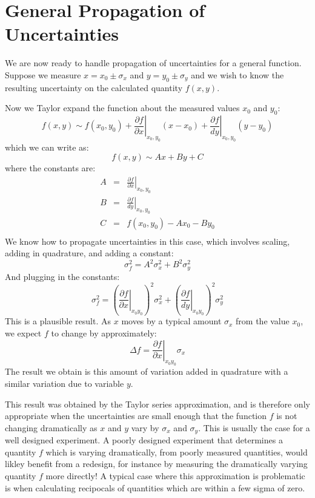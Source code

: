 \documentclass[12pt,oneside]{book}
\begin{document}
\section{General Propagation of Uncertainties}

We are now ready to handle propagation of uncertainties for a general
function.  Suppose we measure $x = x_0 \pm \sigma_x$ and $y = y_0 \pm
\sigma_y$ and we wish to know the resulting uncertainty on the
calculated quantity $f(x,y)$.

Now we Taylor expand the function about the measured values $x_0$ and $y_0$:
\begin{equation*}
f(x,y) \sim f(x_0,y_0) + \left.\frac{\partial f}{\partial x}\right|_{x_0,y_0} (x-x_0) + \left.\frac{\partial f}{dy}\right|_{x_0,y_0} (y-y_0) 
\end{equation*}
which we can write as:
\begin{equation*}
f(x,y) \sim A x + B y + C  
\end{equation*}
where the constants are:
\begin{eqnarray*}
  A  &=& \left.\frac{\partial f}{\partial x}\right|_{x_0,y_0}\\
  B  &=& \left.\frac{\partial f}{dy}\right|_{x_0,y_0}\\
  C  &=& f(x_0,y_0) - A x_0 - B y_0\\
\end{eqnarray*}
We know how to propagate uncertainties in this case, which involves scaling, adding in quadrature, and adding a constant:
\begin{equation*}
\sigma_f^2 =   A^2 \sigma_x^2 + B^2 \sigma_y^2 
\end{equation*}
And plugging in the constants:
\begin{equation}
\label{eqn:prop}
\sigma^2_f = \left(\left.\frac{\partial f}{\partial x}\right|_{x_0 y_0} \right)^2 \sigma^2_x  + \left( \left.\frac{\partial f}{dy} \right|_{x_0 y_0} \right)^2 \sigma^2_y
\end{equation}   
This is a plausible result.  As $x$ moves by a typical amount $\sigma_x$ from the value $x_0$, we expect $f$ to change by approximately:
\begin{equation*}
  \Delta f = \left.\frac{\partial f}{\partial x}\right|_{x_0 y_0} \sigma_x
\end{equation*}   
The result we obtain is this amount of variation added in quadrature with a similar variation due to variable $y$.

This result was obtained by the Taylor series approximation, and is
therefore only appropriate when the uncertainties are small enough
that the function $f$ is not changing dramatically as $x$ and $y$ vary
by $\sigma_x$ and $\sigma_y$.  This is usually the case for a well
designed experiment.  A poorly designed experiment that determines a
quantity $f$ which is varying dramatically, from poorly measured
quantities, would likley benefit from a redesign, for instance by
measuring the dramatically varying quantity $f$ more directly!  A
typical case where this approximation is problematic is when
calculating recipocals of quantities which are within a few sigma of
zero.
\end{document}
